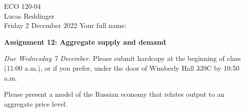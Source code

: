 \documentclass[
    letterpaper,paper=portrait,fleqn,
    DIV=16,fontsize=12pt,twoside=semi,
    parskip=full-,
    headings=standardclasses]
{scrartcl}
\begin{document}
\RaggedRight
\thispagestyle{plain}

ECO 120-04 \\
Lucas Reddinger \\
Friday 2 December 2022 \hfill Your full name: \underline{\hspace{3.25in}}

\vspace{0.7\baselineskip}
\textbf{\LARGE Assignment 12: Aggregate supply and demand}
\vspace{0.3\baselineskip}

\emph{Due Wednesday 7 December.} Please submit hardcopy at the beginning of class (11:00 a.m.), or if you prefer, under the door of Wimberly Hall 339C by 10:50 a.m.

{\centering

\vspace{-0.5\baselineskip}
\vspace{-0.5\baselineskip}

}

Please present a model of the Russian economy that relates output to an aggregate price level.
\end{document}
